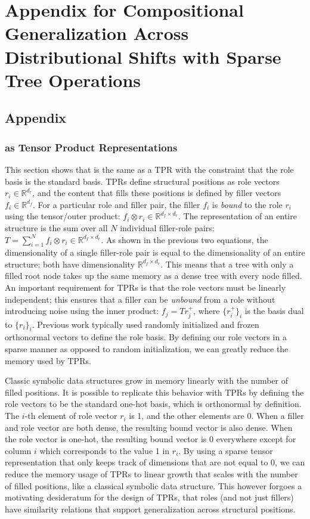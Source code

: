 \chapter{Appendix for Compositional Generalization Across Distributional Shifts with Sparse Tree Operations} \label{chap:appendix-c}

\section{Appendix}

\subsection{\fullrepname as Tensor Product Representations} \label{sec:sdtm-appendix-sparse-tprs}
This section shows that \fullrepname is the same as a TPR with the constraint that the role basis is the standard basis. TPRs define structural positions as role vectors $r_i \in \mathbb{R}^{d_r}$, and the content that fills these positions is defined by filler vectors $f_i \in \mathbb{R}^{d_f}$. For a particular role and filler pair, the filler $f_i$ is \textit{bound} to the role $r_i$ using the tensor/outer product: $f_i \otimes r_i \in \mathbb{R}^{d_f \times d_r}$. The representation of an entire structure is the sum over all $N$ individual filler-role pairs: $T = \sum_{i=1}^N f_i \otimes r_i  \in \mathbb{R}^{d_f \times d_r}$. As shown in the previous two equations, the dimensionality of a single filler-role pair is equal to the dimensionality of an entire structure: both have dimensionality $\mathbb{R}^{d_f \times d_r}$. This means that a tree with only a filled root node takes up the same memory as a dense tree with every node filled. An important requirement for TPRs is that the role vectors must be linearly independent; this ensures that a filler can be \textit{unbound} from a role without introducing noise using the inner product: $f_j = Tr^+_j$, where $\{r^+_i\}_i$ is the basis dual to $\{r_i\}_i$. Previous work typically used randomly initialized and frozen orthonormal vectors to define the role basis. By defining our role vectors in a sparse manner as opposed to random initialization, we can greatly reduce the memory used by TPRs.

Classic symbolic data structures grow in memory linearly with the number of filled positions.  It is possible to replicate this behavior with TPRs by defining the role vectors to be the standard one-hot basis, which is orthonormal by definition. The $i$-th element of role vector $r_i$ is 1, and the other elements are 0. When a filler and role vector are both dense, the resulting bound vector is also dense. When the role vector is one-hot, the resulting bound vector is 0 everywhere except for column $i$ which corresponds to the value 1 in $r_i$. By using a sparse tensor representation that only keeps track of dimensions that are not equal to 0, we can reduce the memory usage of TPRs to linear growth that scales with the number of filled positions, like a classical symbolic data structure. This however forgoes a motivating desideratum for the design of TPRs, that roles (and not just fillers) have similarity relations that support generalization across structural positions.

